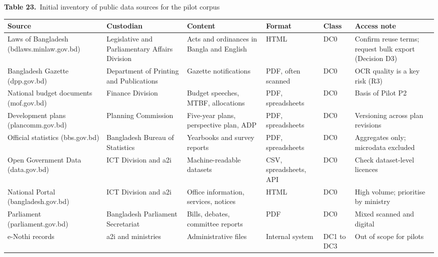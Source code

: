 \documentclass[border=10pt]{standalone}
\begin{document}
\begin{minipage}{22cm}
{\large\bfseries Table 23.}\ {\large Initial inventory of public data sources for the pilot corpus}\par\vspace{7pt}
\small
{}
\begin{tabularx}{\linewidth}{@{}>{\hsize=1.189\hsize\raggedright\arraybackslash}X>{\hsize=1.189\hsize\raggedright\arraybackslash}X>{\hsize=1.245\hsize\raggedright\arraybackslash}X>{\hsize=0.623\hsize\raggedright\arraybackslash}X>{\hsize=0.453\hsize\raggedright\arraybackslash}X>{\hsize=1.302\hsize\raggedright\arraybackslash}X@{}}
\arrayrulecolor{bapilrule}\toprule
\rowcolor{white}\textbf{Source} & \textbf{Custodian} & \textbf{Content} & \textbf{Format} & \textbf{Class} & \textbf{Access note} \\
\midrule
Laws of Bangladesh (bdlaws.minlaw.gov.bd) & Legislative and Parliamentary Affairs Division & Acts and ordinances in Bangla and English & HTML & DC0 & Confirm reuse terms; request bulk export (Decision D3) \\
Bangladesh Gazette (dpp.gov.bd) & Department of Printing and Publications & Gazette notifications & PDF, often scanned & DC0 & OCR quality is a key risk (R3) \\
National budget documents (mof.gov.bd) & Finance Division & Budget speeches, MTBF, allocations & PDF, spreadsheets & DC0 & Basis of Pilot P2 \\
Development plans (plancomm.gov.bd) & Planning Commission & Five-year plans, perspective plan, ADP & PDF, spreadsheets & DC0 & Versioning across plan revisions \\
Official statistics (bbs.gov.bd) & Bangladesh Bureau of Statistics & Yearbooks and survey reports & PDF, spreadsheets & DC0 & Aggregates only; microdata excluded \\
Open Government Data (data.gov.bd) & ICT Division and a2i & Machine-readable datasets & CSV, spreadsheets, API & DC0 & Check dataset-level licences \\
National Portal (bangladesh.gov.bd) & ICT Division and a2i & Office information, services, notices & HTML & DC0 & High volume; prioritise by ministry \\
Parliament (parliament.gov.bd) & Bangladesh Parliament Secretariat & Bills, debates, committee reports & PDF & DC0 & Mixed scanned and digital \\
e-Nothi records & a2i and ministries & Administrative files & Internal system & DC1 to DC3 & Out of scope for pilots \\

\end{tabularx}
\end{minipage}
\end{document}

